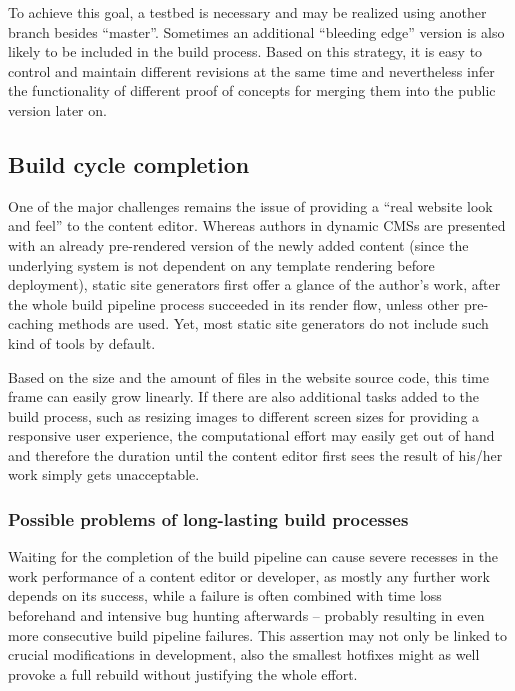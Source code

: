 To achieve this goal, a testbed is necessary and may be realized using another branch besides ``master''. Sometimes an additional ``bleeding edge'' version is also likely to be included in the build process. Based on this strategy, it is easy to control and maintain different revisions at the same time and nevertheless infer the functionality of different proof of concepts for merging them into the public version later on.


\subsection{Build cycle completion}
\label{sec:challenges-buildcyclecompletion}

One of the major challenges remains the issue of providing a ``real website look and feel'' to the content editor. Whereas authors in dynamic CMSs are presented with an already pre-rendered version of the newly added content (since the underlying system is not dependent on any template rendering before deployment), static site generators first offer a glance of the author's work, after the whole build pipeline process succeeded in its render flow, unless other pre-caching methods are used. Yet, most static site generators do not include such kind of tools by default.

Based on the size and the amount of files in the website source code, this time frame can easily grow linearly. If there are also additional tasks added to the build process, such as resizing images to different screen sizes for providing a  responsive user experience, the computational effort may easily get out of hand and therefore the duration until the content editor first sees the result of his/her work simply gets unacceptable.

\subsubsection{Possible problems of long-lasting build processes}
Waiting for the completion of the build pipeline can cause severe recesses in the work performance of a content editor or developer, as mostly any further work depends on its success, while a failure is often combined with time loss beforehand and intensive bug hunting afterwards -- probably resulting in even more consecutive build pipeline failures. This assertion may not only be linked to crucial modifications in development, also the smallest hotfixes might as well provoke a full rebuild without justifying the whole effort.

